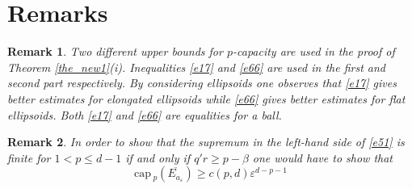 \documentclass[a4paper,9pt]{article}
\newtheorem{remark} {Remark}
\def\cp{\mathrm{cap}\,}
\begin{document}
\section{Remarks}\label{sec5}

\begin{remark}\label{rem1}
Two different upper bounds for $p$-capacity are used in the proof of Theorem \ref{the_new1}(i). Inequalities  \eqref{e17} and \eqref{e66} are used in the first and second part respectively. By considering ellipsoids one observes that \eqref{e17} gives better estimates for elongated ellipsoids while \eqref{e66} gives better estimates for flat ellipsoids. Both \eqref{e17} and \eqref{e66} are equalities for a ball.
\end{remark}

\smallskip

\begin{remark}\label{rem2}
In order to show that the supremum in the left-hand side of \eqref{e51} is finite for $1<p\le d-1$ if and only if $q'r\ge p-\beta$ one would have to show that
\[
\cp_p(\overline{E_{a_\varepsilon}}) \ge c(p,d) \varepsilon^{d-p-1}
\]
\end{remark}

\smallskip
\end{document}
